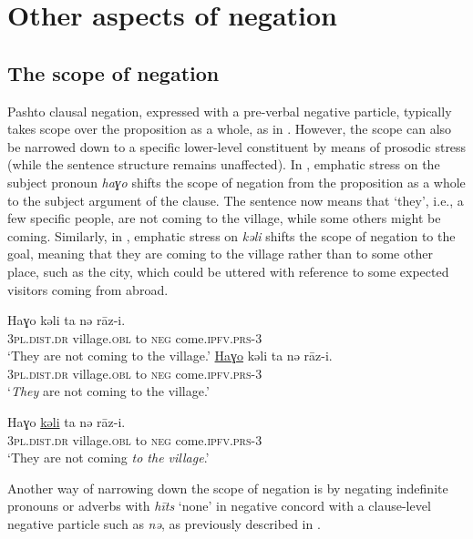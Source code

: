 \documentclass[output=paper,colorlinks,citecolor=brown]{langscibook}
\begin{document}
\section{Other aspects of negation}\label{sec:pas:4}

\subsection{The scope of negation}\label{sec:pas:4.1}

Pashto clausal negation, expressed with a pre-verbal negative particle, typically takes scope over the proposition as a whole, as in . However, the scope can also be narrowed down to a specific lower-level constituent by means of prosodic stress (while the sentence structure remains unaffected). In , emphatic stress on the subject pronoun \textit{haɣo} shifts the scope of negation from the proposition as a whole to the subject argument of the clause. The sentence now means that ‘they’, i.e., a few specific people, are not coming to the village, while some others might be coming. Similarly, in , emphatic stress on \textit{kəli} shifts the scope of negation to the goal, meaning that they are coming to the village rather than to some other place, such as the city, which could be uttered with reference to some expected visitors coming from abroad. 

\ea\label{ex:pas:45}
    \ea\label{ex:pas:45a}
        \gll Haɣo kəli ta nə rāz-i.\\
             \textsc{3pl.dist.dr} village.\textsc{obl} to \textsc{neg} come.\textsc{ipfv.prs-3}\\
        \glt ‘They are not coming to the village.’ 
    \ex\label{ex:pas:45b}
        \gll \uline{Haɣo} kəli ta nə rāz-i.\\
             \textsc{3pl.dist.dr} village.\textsc{obl} to \textsc{neg} come.\textsc{ipfv.prs-3}\\
        \glt ‘\textit{They} are not coming to the village.’

    \ex\label{ex:pas:45c}
        \gll Haɣo \uline{kəli} ta nə rāz-i.\\
             \textsc{3pl.dist.dr} village.\textsc{obl} to \textsc{neg} come.\textsc{ipfv.prs-3}\\
        \glt ‘They are not coming \textit{to the village}.’ 
    \z
\z 

Another way of narrowing down the scope of negation is by negating indefinite pronouns or adverbs with \textit{h\={i}ts} ‘none’ in negative concord with a clause-level negative particle such as \textit{nə}, as previously described in .
\end{document}
